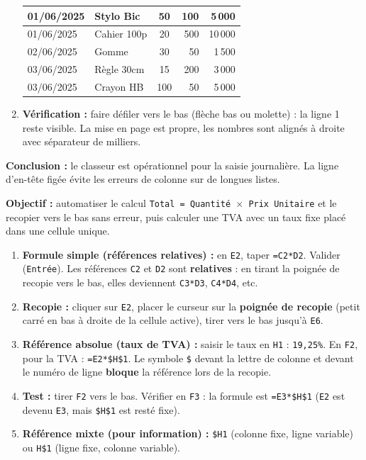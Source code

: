 \documentclass[11pt]{article}
\begin{document}
\begin{exoresolu}
\begin{enumerate}
\begin{center}
\begin{tabularx}{\linewidth}{|l|X|c|r|r|}
    01/06/2025 & Stylo Bic & 50 & 100 & 5\,000 \\\hline
    01/06/2025 & Cahier 100p & 20 & 500 & 10\,000 \\\hline
    02/06/2025 & Gomme & 30 & 50 & 1\,500 \\\hline
    03/06/2025 & Règle 30cm & 15 & 200 & 3\,000 \\\hline
    03/06/2025 & Crayon HB & 100 & 50 & 5\,000 \\\hline
    \end{tabularx}
    \end{center}
    \item \textbf{Vérification :} faire défiler vers le bas (flèche bas ou molette) : la ligne 1 reste visible. La mise en page est propre, les nombres sont alignés à droite avec séparateur de milliers.
\end{enumerate}
\textbf{Conclusion :} le classeur est opérationnel pour la saisie journalière. La ligne d'en-tête figée évite les erreurs de colonne sur de longues listes.
\end{exoresolu}

\begin{methode}
\textbf{Objectif :} automatiser le calcul \texttt{Total = Quantité $\times$ Prix Unitaire} et le recopier vers le bas sans erreur, puis calculer une TVA avec un taux fixe placé dans une cellule unique.
\begin{enumerate}
    \item \textbf{Formule simple (références relatives) :} en \texttt{E2}, taper \texttt{=C2*D2}. Valider (\texttt{Entrée}). Les références \texttt{C2} et \texttt{D2} sont \textbf{relatives} : en tirant la poignée de recopie vers le bas, elles deviennent \texttt{C3*D3}, \texttt{C4*D4}, etc.
    \item \textbf{Recopie :} cliquer sur \texttt{E2}, placer le curseur sur la \textbf{poignée de recopie} (petit carré en bas à droite de la cellule active), tirer vers le bas jusqu'à \texttt{E6}.
    \item \textbf{Référence absolue (taux de TVA) :} saisir le taux en \texttt{H1} : \texttt{19,25\%}. En \texttt{F2}, pour la TVA : \texttt{=E2*\$H\$1}. Le symbole \texttt{\$} devant la lettre de colonne et devant le numéro de ligne \textbf{bloque} la référence lors de la recopie.
    \item \textbf{Test :} tirer \texttt{F2} vers le bas. Vérifier en \texttt{F3} : la formule est \texttt{=E3*\$H\$1} (\texttt{E2} est devenu \texttt{E3}, mais \texttt{\$H\$1} est resté fixe).
    \item \textbf{Référence mixte (pour information) :} \texttt{\$H1} (colonne fixe, ligne variable) ou \texttt{H\$1} (ligne fixe, colonne variable).
\end{enumerate}
\end{methode}
\end{document}

